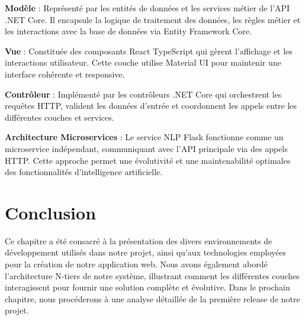 \noindent \textbf{Modèle} : Représenté par les entités de données et les services métier de l'API .NET Core. Il encapsule la logique de traitement des données, les règles métier et les interactions avec la base de données via Entity Framework Core.

\noindent \textbf{Vue} : Constituée des composants React TypeScript qui gèrent l'affichage et les interactions utilisateur. Cette couche utilise Material UI pour maintenir une interface cohérente et responsive.

\noindent \textbf{Contrôleur} : Implémenté par les contrôleurs .NET Core qui orchestrent les requêtes HTTP, valident les données d'entrée et coordonnent les appels entre les différentes couches et services.

\noindent \textbf{Architecture Microservices} : Le service NLP Flask fonctionne comme un microservice indépendant, communiquant avec l'API principale via des appels HTTP. Cette approche permet une évolutivité et une maintenabilité optimales des fonctionnalités d'intelligence artificielle.

\section*{Conclusion}

\noindent Ce chapitre a été consacré à la présentation des divers environnements de développement utilisés dans notre projet, ainsi qu'aux technologies employées pour la création de notre application web. Nous avons également abordé l'architecture N-tiers de notre système, illustrant comment les différentes couches interagissent pour fournir une solution complète et évolutive. Dans le prochain chapitre, nous procéderons à une analyse détaillée de la première release de notre projet.